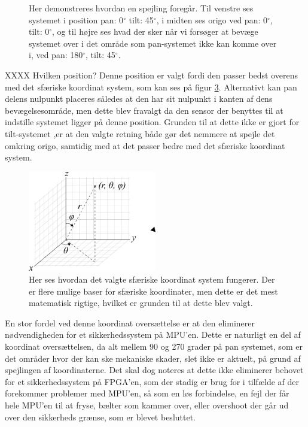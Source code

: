 \begin{figure}[!h]
\begin{subfigure}[b]{0.3\textwidth}
        \caption{}
        \label{fig:tilt_spejl}
    \end{subfigure}
   \caption{Her demonstreres hvordan en spejling foregår. Til venstre ses systemet i position pan: 0$^{\circ}$ tilt: 45$^{\circ}$, i midten ses origo ved pan: 0$^{\circ}$, tilt: 0$^{\circ}$, og til højre ses hvad der sker når vi forsøger at bevæge systemet over i det område som pan-systemet ikke kan komme over i, ved pan: 180$^{\circ}$, tilt: 45$^{\circ}$.}
\end{figure}

XXXX Hvilken position? Denne position er valgt fordi den passer bedst overens med det sfæriske koordinat system, som kan ses på figur \ref{fig:Spherical}. Alternativt kan pan delens nulpunkt placeres således at den har sit nulpunkt i kanten af dens bevægelsesområde, men dette blev fravalgt da den sensor der benyttes til at indstille systemet ligger på denne position. Grunden til at dette ikke er gjort for tilt-systemet ,er at den valgte retning både gør det nemmere at spejle det omkring origo, samtidig med at det passer bedre med det sfæriske koordinat system.

\begin{figure}[!hb]
	\begin{center}
		\includegraphics[width=0.5\textwidth]{Billeder/Spherical.png}
	\end{center}		
	\caption{Her ses hvordan det valgte sfæriske koordinat system fungerer. Der er flere mulige baser for sfæriske koordinater, men dette er det mest matematisk rigtige, hvilket er grunden til at dette blev valgt.}
	\label{fig:Spherical}
\end{figure}
En stor fordel ved denne koordinat oversættelse er at den eliminerer nødvendigheden for et sikkerhedssystem på MPU'en. Dette er naturligt en del af koordinat oversættelsen, da alt mellem 90 og 270 grader på pan systemet, som er det områder hvor der kan ske mekaniske skader, slet ikke er aktuelt, på grund af spejlingen af koordinaterne. Det skal dog noteres at dette ikke eliminerer behovet for et sikkerhedssystem på FPGA'en, som der stadig er brug for i tilfælde af der forekommer problemer med MPU'en, så som en løs forbindelse, en fejl der får hele MPU'en til at fryse, bælter som kammer over, eller overshoot der går ud over den sikkerheds grænse, som er blevet besluttet.




















